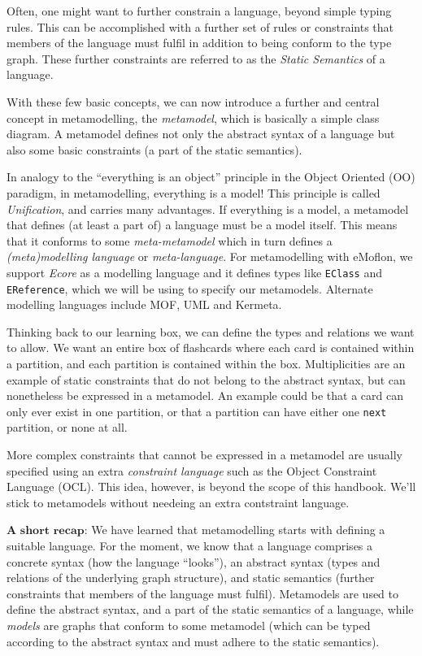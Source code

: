 Often, one might want to further constrain a language, beyond simple typing rules. This can be accomplished with a further set of rules or constraints that
members of the language must fulfil in addition to being conform to the type graph. These further constraints are referred to as the
\emph{Static Semantics} of a language.

With these few basic concepts, we can now introduce a further and central concept in metamodelling, the \emph{metamodel}, which is basically a
simple class diagram. A metamodel defines not only the abstract syntax of a language but also some basic constraints (a part of the static semantics).

In analogy to the ``everything is an object'' principle in the Object Oriented (OO) paradigm, in metamodelling, everything is a model! This
principle is called \emph{Unification},  and carries many advantages. If everything is a model, a metamodel that defines (at least a part
of) a language must be a model itself. This means that it conforms to some \emph{meta-metamodel} which in turn defines a 
\emph{(meta)modelling language} or \emph{meta-language}. For metamodelling with eMoflon, we support \emph{Ecore} as a modelling language
and it defines types like \texttt{EClass} and \texttt{EReference}, which we will be using to specify  our metamodels. Alternate modelling languages include MOF,
UML and Kermeta.

Thinking back to our learning box, we can define the types and relations we want to allow. We want an entire box of flashcards where each card is contained
within a partition, and each partition is contained within the box. Multiplicities are an example of static constraints that do not belong to the abstract
syntax, but can nonetheless be expressed in a metamodel.
An example could be that a card can only ever exist in one partition, or that a partition can have either one \texttt{next} partition, or none at all.

More complex constraints that cannot be expressed in a metamodel are usually specified using an extra \emph{constraint language}
such as the Object Constraint Language (OCL). This idea, however,  is beyond the scope of this handbook. We'll stick to metamodels without needeing an extra
contstraint language.

$\textbf{A short recap:}$ We have learned that metamodelling starts with defining a suitable language. For the moment, we know that a language comprises a
concrete syntax (how the language ``looks''),  an abstract syntax (types and relations of the underlying graph structure), and static semantics (further
constraints that members of the language must fulfil). Metamodels are used to define the abstract syntax, and a part of the static semantics of a language,
while \emph{models} are graphs that conform to some metamodel (which can be typed according to the abstract syntax and must adhere to the static
semantics).

